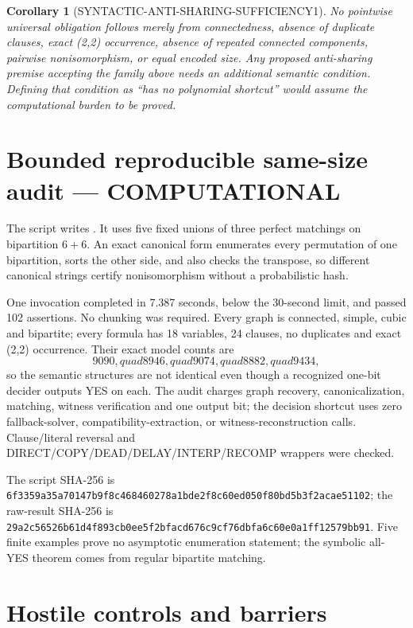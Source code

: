 \documentclass[11pt]{article}
\newtheorem{corollary}[theorem]{Corollary}
\newcommand{\COMP}{\textbf{COMPUTATIONAL}}
\begin{document}
\begin{corollary}[SYNTACTIC-ANTI-SHARING-SUFFICIENCY1]
No pointwise universal obligation follows merely from connectedness, absence
of duplicate clauses, exact (2,2) occurrence, absence of repeated connected
components, pairwise nonisomorphism, or equal encoded size.  Any proposed
anti-sharing premise accepting the family above needs an additional semantic
condition.  Defining that condition as ``has no polynomial shortcut'' would
assume the computational burden to be proved.
\end{corollary}

\section{Bounded reproducible same-size audit --- \COMP}

The script
writes
.
It uses five fixed unions of three perfect matchings on bipartition
\(6+6\).  An exact canonical form enumerates every permutation of one
bipartition, sorts the other side, and also checks the transpose, so different
canonical strings certify nonisomorphism without a probabilistic hash.

One invocation completed in 7.387 seconds, below the 30-second limit, and
passed 102 assertions.  No chunking was required.  Every graph is connected,
simple, cubic and bipartite; every formula has 18 variables, 24 clauses, no
duplicates and exact (2,2) occurrence.  Their exact model counts are
\[
 9090,quad 8946,quad 9074,quad 8882,quad 9434,
\]
so the semantic structures are not identical even though a recognized
one-bit decider outputs YES on each.  The audit charges graph recovery,
canonicalization, matching, witness verification and one output bit; the
decision shortcut uses zero fallback-solver, compatibility-extraction, or
witness-reconstruction calls.  Clause/literal reversal and
DIRECT/COPY/DEAD/DELAY/INTERP/RECOMP wrappers were checked.

The script SHA-256 is
\nolinkurl{6f3359a35a70147b9f8c468460278a1bde2f8c60ed050f80bd5b3f2acae51102};
the raw-result SHA-256 is
\nolinkurl{29a2c56526b61d4f893cb0ee5f2bfacd676c9cf76dbfa6c60e0a1ff12579bb91}.
Five finite examples prove no asymptotic enumeration statement; the symbolic
all-YES theorem comes from regular bipartite matching.

\section{Hostile controls and barriers}
\end{document}
